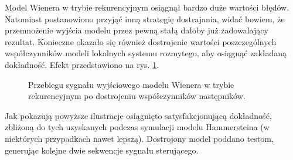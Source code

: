 Model Wienera w trybie rekurencyjnym osiągnął bardzo duże wartości błędów. Natomiast postanowiono przyjąć inną strategię dostrajania, widać bowiem, że przemnożenie wyjścia modelu przez pewną stałą dałoby już zadowalający rezultat. Konieczne okazało się również dostrojenie wartości poszczególnych współczynników modeli lokalnych systemu rozmytego, aby osiągnąć zakładaną dokładność. Efekt przedstawiono na rys. \ref{wien_oe}.

\newpage

\begin{figure}[h!]
\centering
{}
\vfill
{}
\caption{Przebiegu sygnału wyjściowego modelu Wienera w trybie rekurencyjnym po dostrojeniu współczynników następników.}
\label{wien_oe}
\end{figure}

Jak pokazują powyższe ilustracje osiągnięto satysfakcjonującą dokładność, zbliżoną do tych uzyskanych podczas symulacji modelu Hammersteina (w niektórych przypadkach nawet lepszą). Dostrojony model poddano testom, generując kolejne dwie sekwencje sygnału sterującego.

